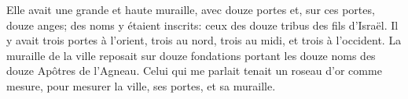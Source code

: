 Elle avait une grande et haute muraille, avec douze portes
	et, sur ces portes, douze anges;
	des noms y étaient inscrits: ceux des douze tribus des fils d’Israël.
Il y avait trois portes à l’orient, trois au nord,
	trois au midi, et trois à l’occident.
La muraille de la ville reposait sur douze fondations
	portant les douze noms des douze Apôtres de l’Agneau.
Celui qui me parlait tenait un roseau d’or comme mesure,
	pour mesurer la ville, ses portes, et sa muraille.
